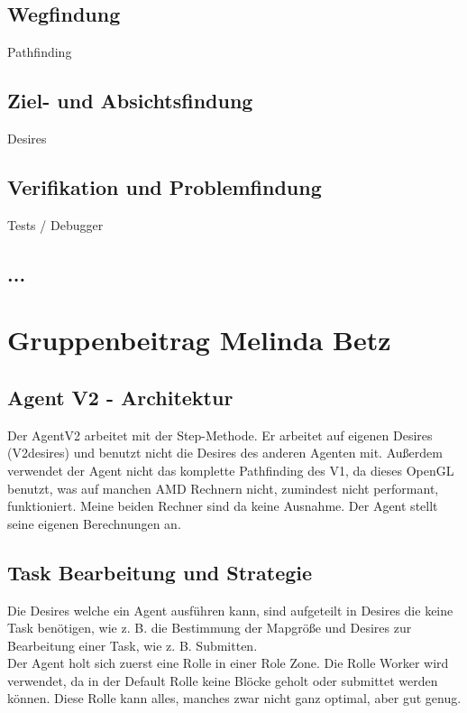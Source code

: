 \documentclass[runningheads]{llncs}
\begin{document}
\subsection{Wegfindung}
Pathfinding

\subsection{Ziel- und Absichtsfindung}
Desires

\subsection{Verifikation und Problemfindung}
Tests / Debugger

\subsection{...}

\section{Gruppenbeitrag Melinda Betz}
\subsection{Agent V2 - Architektur}
Der AgentV2 arbeitet mit der Step-Methode. 
Er arbeitet auf eigenen Desires (V2desires) und benutzt nicht die Desires des anderen Agenten mit. Außerdem verwendet der Agent nicht das komplette Pathfinding des V1, da dieses OpenGL benutzt, was auf manchen AMD Rechnern nicht, zumindest nicht performant, funktioniert. Meine beiden Rechner sind da keine Ausnahme. Der Agent stellt seine eigenen Berechnungen an. 

\subsection{Task Bearbeitung und Strategie}
Die Desires welche ein Agent ausführen kann, sind aufgeteilt in Desires die keine Task benötigen, wie z. B. die Bestimmung der Mapgröße und Desires zur Bearbeitung einer Task, wie z. B. Submitten.\\

Der Agent holt sich zuerst eine Rolle in einer Role Zone. Die Rolle Worker wird verwendet, da in der Default Rolle keine Blöcke geholt oder submittet werden können. Diese Rolle kann alles, manches zwar nicht ganz optimal, aber gut genug.\\
\end{document}

